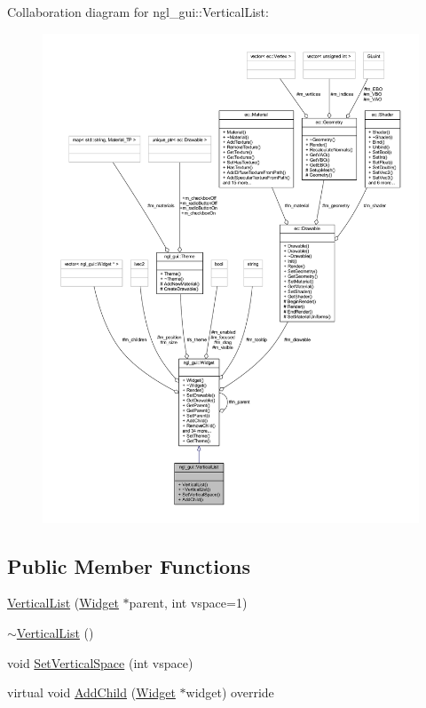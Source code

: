 Collaboration diagram for ngl\+\_\+gui\+:\+:Vertical\+List\+:
\nopagebreak
\begin{figure}[H]
\begin{center}
\leavevmode
\includegraphics[width=350pt]{classngl__gui_1_1_vertical_list__coll__graph}
\end{center}
\end{figure}
\subsection*{Public Member Functions}
\begin{DoxyCompactItemize}
\item 
\mbox{\hyperlink{classngl__gui_1_1_vertical_list_ac78d76dc744752a68484b99829a6231a}{Vertical\+List}} (\mbox{\hyperlink{classngl__gui_1_1_widget}{Widget}} $\ast$parent, int vspace=1)
\item 
\mbox{\hyperlink{classngl__gui_1_1_vertical_list_a97e8d182cd930a69fb44a0a51c180daf}{$\sim$\+Vertical\+List}} ()
\item 
void \mbox{\hyperlink{classngl__gui_1_1_vertical_list_a9cd01a452579837c61a5ebb49df7e612}{Set\+Vertical\+Space}} (int vspace)
\item 
virtual void \mbox{\hyperlink{classngl__gui_1_1_vertical_list_ae8bd79a7e0e91778acb2d93085763138}{Add\+Child}} (\mbox{\hyperlink{classngl__gui_1_1_widget}{Widget}} $\ast$widget) override
\end{DoxyCompactItemize}
